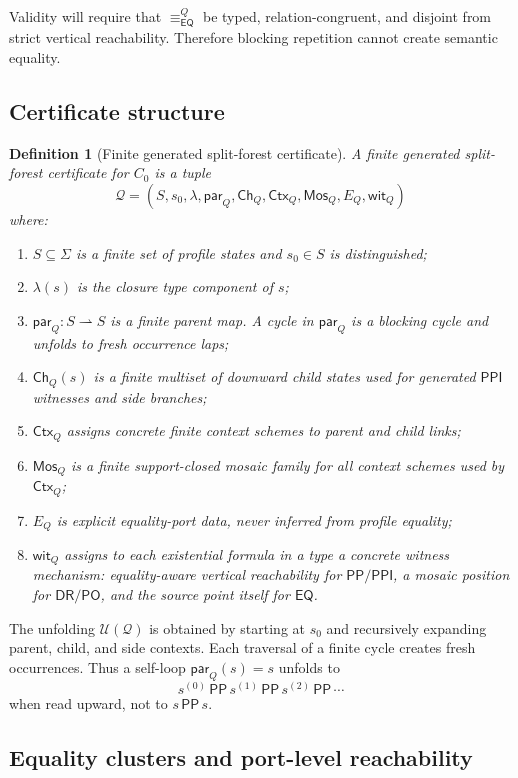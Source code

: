 \documentclass[11pt]{article}
\newtheorem{definition}[theorem]{Definition}
\newcommand{\EQ}{\mathsf{EQ}}
\newcommand{\DR}{\mathsf{DR}}
\newcommand{\PO}{\mathsf{PO}}
\newcommand{\PP}{\mathsf{PP}}
\newcommand{\PPI}{\mathsf{PPI}}
\newcommand{\Q}{\mathcal Q}
\newcommand{\U}{\mathcal U}
\newcommand{\Mos}{\mathsf{Mos}}
\newcommand{\Ctx}{\mathsf{Ctx}}
\newcommand{\parr}{\mathsf{par}}
\newcommand{\eqc}{\equiv_{\EQ}}
\begin{document}
Validity will require that $\eqc^{Q}$ be typed, relation-congruent, and disjoint from strict vertical reachability.  Therefore blocking repetition cannot create semantic equality.

\subsection{Certificate structure}

\begin{definition}[Finite generated split-forest certificate]\label{def:certificate}
A finite generated split-forest certificate for $C_0$ is a tuple
\[
  \Q=(S,s_0,\lambda,\parr_Q,\mathsf{Ch}_Q,\Ctx_Q,\Mos_Q,E_Q,\mathsf{wit}_Q)
\]
where:
\begin{enumerate}[label=(Q\arabic*)]
\item $S\subseteq\Sigma$ is a finite set of profile states and $s_0\in S$ is distinguished;
\item $\lambda(s)$ is the closure type component of $s$;
\item $\parr_Q:S\rightharpoonup S$ is a finite parent map.  A cycle in $\parr_Q$ is a blocking cycle and unfolds to fresh occurrence laps;
\item $\mathsf{Ch}_Q(s)$ is a finite multiset of downward child states used for generated $\PPI$ witnesses and side branches;
\item $\Ctx_Q$ assigns concrete finite context schemes to parent and child links;
\item $\Mos_Q$ is a finite support-closed mosaic family for all context schemes used by $\Ctx_Q$;
\item $E_Q$ is explicit equality-port data, never inferred from profile equality;
\item $\mathsf{wit}_Q$ assigns to each existential formula in a type a concrete witness mechanism: equality-aware vertical reachability for $\PP/\PPI$, a mosaic position for $\DR/\PO$, and the source point itself for $\EQ$.
\end{enumerate}
\end{definition}

The unfolding $\U(\Q)$ is obtained by starting at $s_0$ and recursively expanding parent, child, and side contexts.  Each traversal of a finite cycle creates fresh occurrences.  Thus a self-loop $\parr_Q(s)=s$ unfolds to
\[
  s^{(0)}\,\PP\,s^{(1)}\,\PP\,s^{(2)}\,\PP\,\cdots
\]
when read upward, not to $s\,\PP\,s$.

\subsection{Equality clusters and port-level reachability}
\label{ssec:port-reach}
\end{document}
